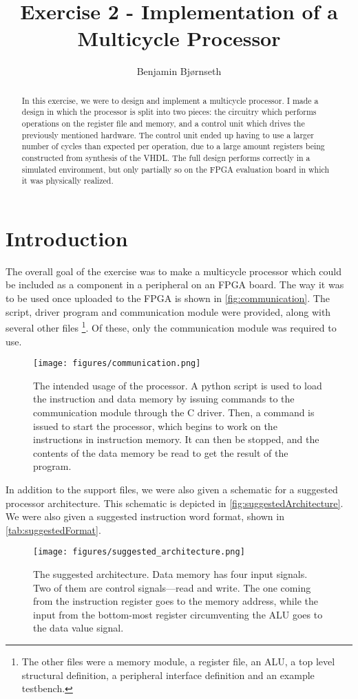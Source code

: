 \documentclass[11pt]{article}
\title{Exercise 2 - Implementation of a Multicycle Processor}
\author{Benjamin Bj\o rnseth}
\begin{document}
\maketitle

\begin{abstract}
  In this exercise, we were to design and implement a multicycle processor. I
  made a design in which the processor is split into two pieces: the circuitry
  which performs operations on the register file and memory, and a control unit
  which drives the previously mentioned hardware. The control unit ended up
  having to use a larger number of cycles than expected per operation, due to a
  large amount registers being constructed from synthesis of the VHDL. The full
  design performs correctly in a simulated environment, but only partially so on
  the FPGA evaluation board in which it was physically realized.
\end{abstract}

\section{Introduction}
\label{sec:introduction}
The overall goal of the exercise was to make a multicycle processor
which could be included as a component in a peripheral on an FPGA
board. The way it was to be used once uploaded to the FPGA is shown in
\autoref{fig:communication}. The script, driver program and
communication module were provided, along with several other files
\footnote{The other files were a memory module, a register file, an
  ALU, a top level structural definition, a peripheral interface
  definition and an example testbench.}. Of these, only the
communication module was required to use.

\begin{figure}[ht]
  \centering
  \texttt{[image: figures/communication.png]}
  \caption{\label{fig:communication} The intended usage of the
    processor. A python script is used to load the instruction and
    data memory by issuing commands to the communication module
    through the C driver. Then, a command is issued to start the
    processor, which begins to work on the instructions in instruction
    memory. It can then be stopped, and the contents of the data
    memory be read to get the result of the program.}
\end{figure}

In addition to the support files, we were also given a schematic for a
suggested processor architecture. This schematic is depicted in
\autoref{fig:suggestedArchitecture}. We were also given a suggested
instruction word format, shown in \autoref{tab:suggestedFormat}.
\begin{figure}[ht]
  \centering
  \texttt{[image: figures/suggested\_architecture.png]}
  \caption{\label{fig:suggestedArchitecture} The suggested
    architecture. Data memory has four input signals. Two of them are
    control signals---read and write. The one coming from the
    instruction register goes to the memory address, while the input
    from the bottom-most register circumventing the ALU goes to the
    data value signal.}
\end{figure}
\end{document}
